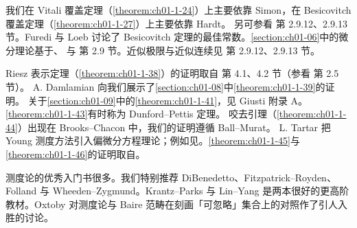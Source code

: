 \documentclass[../../main.tex]{subfiles}%
\begin{document}
我们在 Vitali 覆盖定理（\cref{theorem:ch01-1-24}）上主要依靠 Simon\cite{simon1984}，在 Besicovitch 覆盖定理（\cref{theorem:ch01-1-27}）上主要依靠 Hardt\cite{hardt1979}。%
另可参看\cite{federer1969} 第 2.9.12、2.9.13 节。Furedi 与 Loeb\cite{furedi1994} 讨论了 Besicovitch 定理的最佳常数。\cref{section:ch01-06}中的微分理论基于\cite{hardt1979}、\cite{simon1984} 与\cite{federer1969} 第 2.9 节。近似极限与近似连续见\cite{federer1969} 第 2.9.12、2.9.13 节。%

Riesz 表示定理（\cref{theorem:ch01-1-38}）的证明取自\cite{simon1984} 第 4.1、4.2 节（参看\cite{federer1969} 第 2.5 节）。%
A. Damlamian 向我们展示了\cref{section:ch01-08}中\cref{theorem:ch01-1-39}的证明。%
关于\cref{section:ch01-09}中的\cref{theorem:ch01-1-41}，见 Giusti\cite{giusti1984} 附录 A。%
\cref{theorem:ch01-1-43}有时称为 Dunford--Pettis 定理。%
咬去引理（\cref{theorem:ch01-1-44}）出现在 Brooks--Chacon\cite{brooks1980} 中，我们的证明遵循 Ball--Murat\cite{ball1989}。%
L. Tartar 把 Young 测度方法引入偏微分方程理论；例如见\cite{tartar1979}。\cref{theorem:ch01-1-45}与\cref{theorem:ch01-1-46}的证明取自\cite{evans1990}。%

测度论的优秀入门书很多。我们特别推荐 DiBenedetto\cite{dibenedetto2002}、Fitzpatrick--Royden\cite{fitzpatrick2010}、Folland\cite{folland1984} 与 Wheeden--Zygmund\cite{wheeden1977}。Krantz--Parks\cite{krantz1999} 与 Lin--Yang\cite{lin2002} 是两本很好的更高阶教材。Oxtoby\cite{oxtoby1980} 对测度论与 Baire 范畴在刻画「可忽略」集合上的对照作了引人入胜的讨论。
\end{document}
